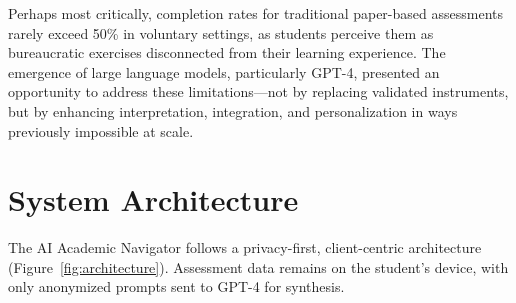 \documentclass[11pt,a4paper]{article}
\begin{document}
Perhaps most critically, completion rates for traditional paper-based assessments rarely exceed 50\% in voluntary settings, as students perceive them as bureaucratic exercises disconnected from their learning experience. The emergence of large language models, particularly GPT-4, presented an opportunity to address these limitations---not by replacing validated instruments, but by enhancing interpretation, integration, and personalization in ways previously impossible at scale.

\section{System Architecture}

The AI Academic Navigator follows a privacy-first, client-centric architecture (Figure~\ref{fig:architecture}). Assessment data remains on the student's device, with only anonymized prompts sent to GPT-4 for synthesis.
\end{document}
